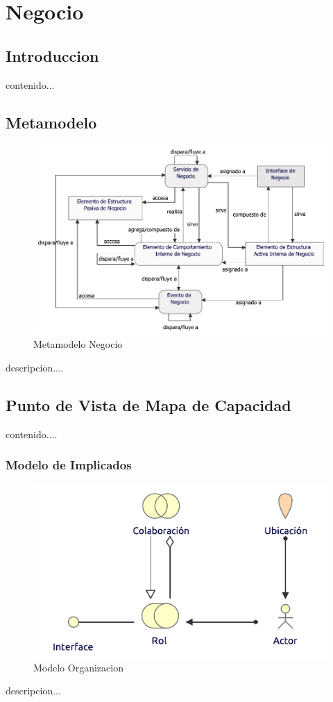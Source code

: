\chapter{Negocio}
\section{Introduccion}
contenido...
\newpage

\section{Metamodelo}
\begin{figure}[h!]
	\centering
	\includegraphics[width=0.9\linewidth]{imgs/meta/Negocio}
	\caption{Metamodelo Negocio}
\end{figure}

descripcion....

\newpage

\section{Punto de Vista de Mapa de Capacidad}
contenido....
\subsection{Modelo de Implicados}
\begin{figure}[h!]
	\centering
	\includegraphics[width=.5\linewidth]{imgs/modelo/Organizacion}
	\caption{Modelo Organizacion}
\end{figure}
descripcion...

